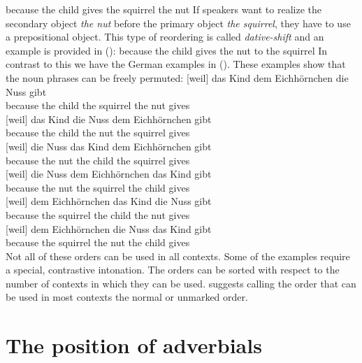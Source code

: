 \ea
because the child gives the squirrel the nut 
\z
If speakers want to realize the secondary object \emph{the nut} before the primary object \emph{the
  squirrel}, they have to use a prepositional object. This type of reordering is called
\emph{dative-shift} and an example is provided in ():
\ea
because the child gives the nut to the squirrel 
\z
In contrast to this we have the German examples in (). These examples show that the noun
phrases can be freely permuted:
\eal
\ex 
\gll {}[weil]          das Kind dem Eichhörnchen die Nuss gibt\\
     \spacebr{}because the child the squirrel the nut gives\\
\ex 
\gll {}[weil]          das Kind die Nuss dem Eichhörnchen  gibt\\
     \spacebr{}because the child  the nut the squirrel gives\\
\ex 
\gll {}[weil]          die Nuss das Kind dem Eichhörnchen  gibt\\
     \spacebr{}because the nut the child  the squirrel gives\\
\ex 
\gll {}[weil]          die Nuss dem Eichhörnchen  das Kind gibt\\
     \spacebr{}because the nut the squirrel the child  gives\\
\ex 
\gll {}[weil]          dem Eichhörnchen  das Kind die Nuss gibt\\
     \spacebr{}because the squirrel the child  the nut gives\\
\ex 
\gll {}[weil]          dem Eichhörnchen  die Nuss das Kind gibt\\
     \spacebr{}because the squirrel the nut the child  gives\\
\zl
Not all of these orders can be used in all contexts. Some of the examples require a special,
contrastive intonation. The orders can be sorted with respect to the number of contexts in which
they can be used. \citet{Hoehle82a} suggests calling the order that can be used in most contexts the
normal or unmarked order.




\section{The position of adverbials}
\label{sec-phenomena-position-of-adverbials}

